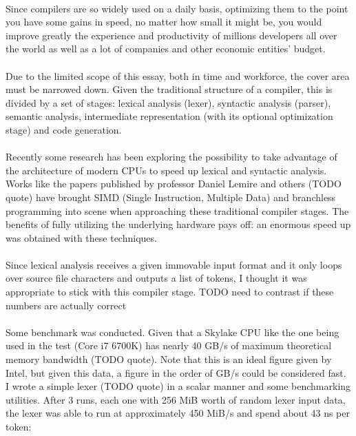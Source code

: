 \documentclass[12pt]{article}
\begin{document}
	\paragraph{}Since compilers are so widely used on a daily basis, optimizing them to the point you have some gains in speed, no matter how small it might be, you would improve greatly the experience and productivity of millions developers all over the world as well as a lot of companies and other economic entities' budget.
	\paragraph{}Due to the limited scope of this essay, both in time and workforce, the cover area must be narrowed down. Given the traditional structure of a compiler, this is divided by a set of stages: lexical analysis (lexer), syntactic analysis (parser), semantic analysis, intermediate representation (with its optional optimization stage) and code generation.
	\paragraph{}Recently some research has been exploring the possibility to take advantage of the architecture of modern CPUs to speed up lexical and syntactic analysis. Works like the papers published by professor Daniel Lemire and others (TODO quote) have brought SIMD (Single Instruction, Multiple Data) and branchless programming into scene when approaching these traditional compiler stages. The benefits of fully utilizing the underlying hardware pays off: an enormous speed up was obtained with these techniques.
	\paragraph{}Since lexical analysis receives a given immovable input format and it only loops over source file characters and outputs a list of tokens, I thought it was appropriate to stick with this compiler stage.
	TODO need to contrast if these numbers are actually correct
	\paragraph{}Some benchmark was conducted. Given that a Skylake CPU like the one being used in the test (Core i7 6700K) has nearly 40 GB/s of maximum theoretical memory bandwidth (TODO quote). Note that this is an ideal figure given by Intel, but given this data, a figure in the order of GB/s could be considered fast. I wrote a simple lexer (TODO quote) in a scalar manner and some benchmarking utilities. After 3 runs, each one with 256 MiB worth of random lexer input data, the lexer was able to run at approximately 450 MiB/s and spend about 43 ns per token:
	
\end{document}
